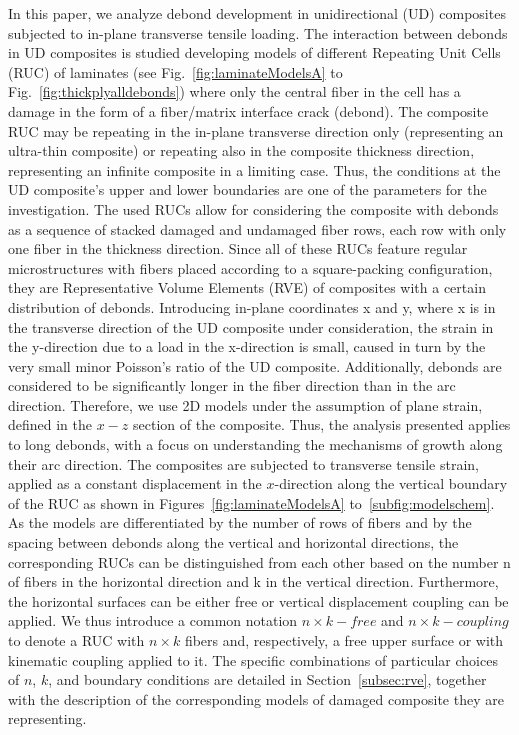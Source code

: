 \documentclass[review]{elsarticle}
\begin{document}
In this paper, we analyze debond development in unidirectional (UD) composites subjected to in-plane transverse tensile loading.  The interaction between debonds in UD composites is studied developing models of different Repeating Unit Cells (RUC) of laminates (see Fig.~\ref{fig:laminateModelsA} to Fig.~\ref{fig:thickplyalldebonds}) where only the central fiber in the cell has a damage in the form of a fiber/matrix interface crack (debond). The composite RUC may be repeating in the in-plane transverse direction only (representing an ultra-thin composite) or repeating also in the composite thickness direction, representing an infinite composite in a limiting case. Thus, the conditions at the UD composite's upper and lower boundaries are one of the parameters for the investigation.  The used RUCs allow for considering the composite with debonds as a sequence of stacked damaged and undamaged fiber rows, each row with only one fiber in the thickness direction. Since all of these RUCs feature regular microstructures with fibers placed according to a square-packing configuration, they are Representative Volume Elements (RVE) of composites with a certain distribution of debonds. Introducing in-plane coordinates x and y, where x is in the transverse direction of the UD composite under consideration, the strain in the y-direction due to a load in the x-direction is small, caused in turn by the very small minor Poisson's ratio of the UD composite. Additionally, debonds are considered to be significantly longer in the fiber direction than in the arc direction. Therefore, we use 2D models under the assumption of plane strain, defined in the $x-z$ section of the composite.  Thus, the analysis presented applies to long debonds, with a focus on understanding the mechanisms of growth along their arc direction. The composites are subjected to transverse tensile strain, applied as a constant displacement in the $x$-direction along the vertical boundary of the RUC as shown in  Figures~\ref{fig:laminateModelsA} to~\ref{subfig:modelschem}. As the models are differentiated by the number of rows of fibers and by the spacing between debonds along the vertical and horizontal directions, the corresponding RUCs can be distinguished from each other based on the number n of fibers in the horizontal direction and k in the vertical direction. Furthermore, the horizontal surfaces can be either free or vertical displacement coupling can be applied. We thus introduce a common notation $n\times k-free$  and $n\times k-coupling$ to denote a RUC with $n\times k$ fibers and, respectively, a free upper surface or with kinematic coupling applied to it. The specific combinations of particular choices of $n$, $k$, and boundary conditions are detailed in Section~\ref{subsec:rve}, together with the description of the corresponding models of damaged composite they are representing.
\end{document}
